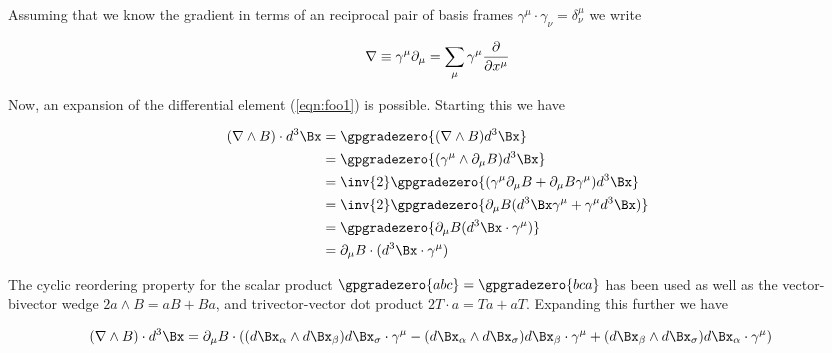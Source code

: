 Assuming that we know the gradient in terms of an reciprocal pair of basis frames $\gamma^\mu \cdot \gamma_\nu = \delta^\mu_\nu$ we write

\begin{align}\label{eqn:foo3}
\nabla \equiv \gamma^\mu \partial_\mu = \sum_\mu \gamma^\mu \frac{\partial {}}{\partial {x^\mu}}
\end{align}

Now, an expansion of the differential element (\ref{eqn:foo1}) is possible.  Starting this we have

\begin{align*}
(\grad \wedge B) \cdot d^3 \Bx
&=
\gpgradezero{ (\grad \wedge B) d^3\Bx } \\
&=
\gpgradezero{ (\gamma^\mu \wedge \partial_\mu B) d^3 \Bx } \\
&=
\inv{2} \gpgradezero{ (\gamma^\mu \partial_\mu B + \partial_\mu B \gamma^\mu) d^3 \Bx } \\
&=
\inv{2} \gpgradezero{ \partial_\mu B (d^3 \Bx \gamma^\mu + \gamma^\mu d^3 \Bx) } \\
&=
\gpgradezero{ \partial_\mu B (d^3 \Bx \cdot \gamma^\mu) } \\
&=
\partial_\mu B \cdot (d^3 \Bx \cdot \gamma^\mu) 
\end{align*}

The cyclic reordering property for the scalar product $\gpgradezero{a b c} = \gpgradezero{ b c a}$ has been used as well as the vector-bivector wedge $2 a \wedge B = a B + B a$, and trivector-vector dot product $2 T \cdot a = T a + a T$.  Expanding this further we have

\begin{align*}
(\grad \wedge B) \cdot d^3 \Bx
&=
\partial_\mu B \cdot \left(
 (d\Bx_\alpha \wedge d\Bx_\beta) d\Bx_\sigma \cdot \gamma^\mu
-(d\Bx_\alpha \wedge d\Bx_\sigma) d\Bx_\beta \cdot \gamma^\mu
+(d\Bx_\beta  \wedge d\Bx_\sigma) d\Bx_\alpha \cdot \gamma^\mu
\right)
\end{align*}

\EndNoBibArticle
